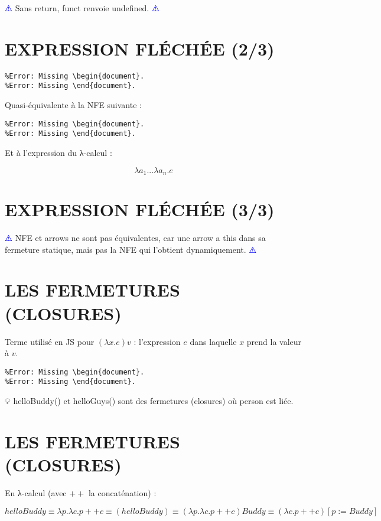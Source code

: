 \documentclass{article}
\begin{document}
\textcolor{blue}{⚠️} Sans return, funct renvoie undefined. \textcolor{blue}{⚠️}

\section{EXPRESSION FLÉCHÉE (2/3)}
\begin{verbatim}
%Error: Missing \begin{document}.
%Error: Missing \end{document}.
\end{verbatim}

Quasi-équivalente à la NFE suivante :
\begin{verbatim}
%Error: Missing \begin{document}.
%Error: Missing \end{document}.
\end{verbatim}
Et à l’expression du λ-calcul :

\[λa_1...λa_n.e\]

\section{EXPRESSION FLÉCHÉE (3/3)}
\textcolor{blue}{⚠️} NFE et arrows ne sont pas équivalentes, car une arrow a this dans sa fermeture statique, mais pas la NFE qui l’obtient dynamiquement. \textcolor{blue}{⚠️}

\section{LES FERMETURES (CLOSURES)}
Terme utilisé en JS pour \((λx.e)v\) : l’expression \(e\) dans laquelle \(x\) prend la valeur à \(v\).

\begin{verbatim}
%Error: Missing \begin{document}.
%Error: Missing \end{document}.
\end{verbatim}

💡 helloBuddy() et helloGuys() sont des fermetures (closures) où person est liée.

\section{LES FERMETURES (CLOSURES)}
En λ-calcul (avec \(++\) la concaténation) :

\[helloBuddy ≡ λp.λc.p++c ≡ (helloBuddy) ≡ (λp.λc.p++c)Buddy ≡ (λc.p++c)[p:=Buddy]\]
\end{document}
